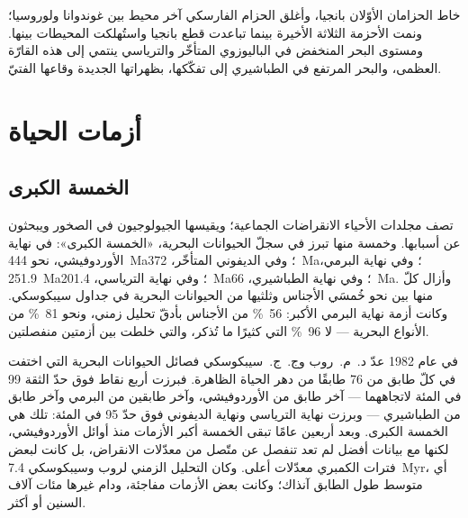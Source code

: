خاط الحزامان الأوّلان بانجيا، وأغلق الحزام الفارسكي آخر محيط بين غوندوانا
ولوروسيا؛ ونمت الأحزمة الثلاثة الأخيرة بينما تباعدت قطع بانجيا واستُهلكت المحيطات بينها.
ومستوى البحر المنخفض في الباليوزوي المتأخّر والترياسي ينتمي إلى هذه
القارّة العظمى، والبحر المرتفع في الطباشيري إلى تفكّكها، بظهراتها الجديدة وقاعها
الفتيّ.

\section{أزمات الحياة}\label{sec:b2:phanerozoic-earth:extinctions}

\subsection*{الخمسة الكبرى}

تصف مجلدات الأحياء الانقراضات الجماعية؛ ويقيسها الجيولوجيون في الصخور ويبحثون عن
أسبابها. وخمسة منها تبرز في سجلّ الحيوانات البحرية، «الخمسة الكبرى»: في نهاية
الأوردوفيشي، نحو \qty{444}{Ma}؛ وفي الديفوني المتأخّر، \qty{372}{Ma}؛ وفي نهاية البرمي،
\qty{251.9}{Ma}؛ وفي نهاية الترياسي، \qty{201.4}{Ma}؛ وفي نهاية الطباشيري،
\qty{66}{Ma}. وأزال كلّ منها بين نحو خُمسَي الأجناس وثلثيها من الحيوانات
البحرية في جداول سيبكوسكي. وكانت أزمة نهاية البرمي الأكبر: \qty{56}{\percent} من
الأجناس بأدقّ تحليل زمني، ونحو \qty{81}{\percent} من الأنواع البحرية --- لا
\qty{96}{\percent} التي كثيرًا ما تُذكر، والتي خلطت بين أزمتين منفصلتين.

\begin{history}
في عام 1982 عدّ د.~م.~روب وج.~ج.~سيبكوسكي فصائل الحيوانات البحرية التي اختفت
في كلّ طابق من 76 طابقًا من دهر الحياة الظاهرة. فبرزت أربع نقاط فوق حدّ الثقة 99 في المئة
لاتجاههما --- آخر طابق من الأوردوفيشي، وآخر طابقين من البرمي وآخر طابق من
الطباشيري --- وبرزت نهاية الترياسي ونهاية الديفوني فوق حدّ 95 في المئة:
تلك هي الخمسة الكبرى. وبعد أربعين عامًا تبقى الخمسة أكبر الأزمات منذ أوائل
الأوردوفيشي، لكنها مع بيانات أفضل لم تعد تنفصل عن متّصل من معدّلات
الانقراض، بل كانت لبعض فترات الكمبري معدّلات أعلى. وكان التحليل الزمني لروب وسيبكوسكي
\qty{7.4}{Myr}، أي متوسط طول الطابق آنذاك؛ وكانت بعض الأزمات مفاجئة، ودام غيرها
مئات آلاف السنين أو أكثر.
\end{history}

